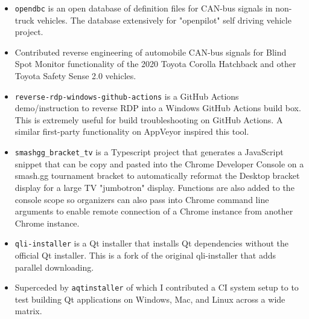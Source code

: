 \documentclass[10pt,letter,ragged2e]{altacv}
\begin{document}
\begin{paracol}{2}
\divider


\begin{itemize}
\item \texttt{opendbc} is an open database of definition files for CAN-bus signals in non-truck vehicles. The database extensively for "openpilot" self driving vehicle project.
\item Contributed reverse engineering of automobile CAN-bus signals for Blind Spot Monitor functionality of the 2020 Toyota Corolla Hatchback and other Toyota Safety Sense 2.0 vehicles.
\end{itemize}

\divider


\begin{itemize}
\item \texttt{reverse-rdp-windows-github-actions} is a GitHub Actions demo/instruction to reverse RDP into a Windows GitHub Actions build box. This is extremely useful for build troubleshooting on GitHub Actions. A similar first-party functionality on AppVeyor inspired this tool.
\end{itemize}

\divider


\begin{itemize}
\item \texttt{smashgg\_bracket\_tv} is a Typescript project that generates a JavaScript snippet that can be copy and pasted into the Chrome Developer Console on a smash.gg tournament bracket to automatically reformat the Desktop bracket display for a large TV "jumbotron" display. Functions are also added to the console scope so organizers can also pass into Chrome command line arguments to enable remote connection of a Chrome instance from another Chrome instance.
\end{itemize}

\divider


\begin{itemize}
\item \texttt{qli-installer} is a Qt installer that installs Qt dependencies without the official Qt installer. This is a fork of the original qli-installer that adds parallel downloading.
\item Superceded by \texttt{aqtinstaller} of which I contributed a CI system setup to to test building Qt applications on Windows, Mac, and Linux across a wide matrix.
\end{itemize}


\end{paracol}
\end{document}
